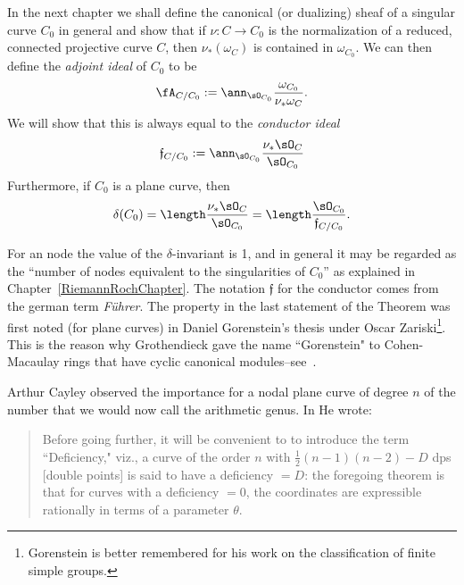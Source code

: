 In the next chapter we shall define the canonical (or dualizing) sheaf of a singular curve $C_0$ in 
general and show that if $\nu: C\to C_0$ is the normalization of a reduced, connected
projective curve $C$, then $\nu_*(\omega_C)$ is contained in $\omega_{C_0}$. We can
then define the \emph{adjoint ideal} of $C_0$ to be 
$$
\fA_{C/C_0} :=\ann_{\sO_{C_0}}\frac{\omega_{C_0}}{\nu_* \omega_C}.
$$
We will show that this is always equal to the \emph{conductor ideal}
$$
\mathfrak f_{C/C_0}: = \ann_{\sO_{C_0}}\frac{\nu_* \sO_C}{\sO_{C_0}}	
$$
Furthermore, if $C_0$ is a plane curve, then 
$$
\delta(C_0) = \length \frac{\nu_* \sO_C}{\sO_{C_0}} = \length \frac {\sO_{C_0}}{\mathfrak f_{C/C_0}}.
$$

For an node the value of the $\delta$-invariant is 1, and in general it may be regarded as the ``number of nodes equivalent to the singularities of $C_0$'' as
explained in Chapter~\ref{RiemannRochChapter}. The notation $\mathfrak f$ for the conductor comes from the german term \emph{F\"uhrer}. The property in the last statement of the
Theorem  was first noted (for plane curves) in Daniel Gorenstein's thesis under Oscar Zariski\footnote{Gorenstein is better remembered for his work on the classification of finite simple groups.}. This is the
reason why Grothendieck gave the name ``Gorenstein" to Cohen-Macaulay rings that have cyclic canonical 
modules--see~\cite{Bass}. 
%
%
%
%

Arthur Cayley observed the importance for a nodal plane curve of degree $n$ of the number
that we would now call the arithmetic genus. In \cite{Cayley2} He wrote:
\begin{quotation}
 Before going further, it will be convenient to to introduce the term ``Deficiency," viz., a curve of the order $n$ with
 $\frac{1}{2}(n-1)(n-2)-D$ dps [double points] is said to have a deficiency $=D$: the foregoing theorem is that for curves with a deficiency $=0$, the coordinates are expressible rationally in terms of a parameter $\theta$.
  \end{quotation}
 
